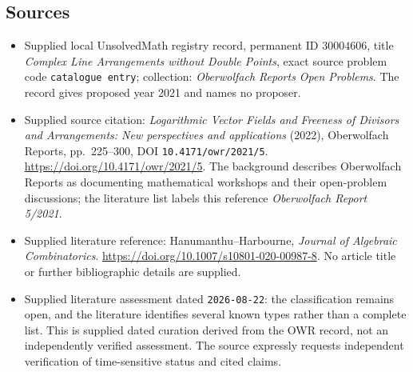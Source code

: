 \documentclass[11pt]{article}
\begin{document}
\subsection{Sources}
\begin{itemize}
\item Supplied local UnsolvedMath registry record, permanent ID \(30004606\), title \emph{Complex Line Arrangements without Double Points}, exact source problem code \texttt{catalogue entry}; collection: \emph{Oberwolfach Reports Open Problems}. The record gives proposed year 2021 and names no proposer.
\item Supplied source citation: \emph{Logarithmic Vector Fields and Freeness of Divisors and Arrangements: New perspectives and applications} (2022), Oberwolfach Reports, pp.\ 225--300, DOI \texttt{10.4171/owr/2021/5}. \url{https://doi.org/10.4171/owr/2021/5}. The background describes Oberwolfach Reports as documenting mathematical workshops and their open-problem discussions; the literature list labels this reference \emph{Oberwolfach Report 5/2021}.
\item Supplied literature reference: Hanumanthu--Harbourne, \emph{Journal of Algebraic Combinatorics}. \url{https://doi.org/10.1007/s10801-020-00987-8}. No article title or further bibliographic details are supplied.
\item Supplied literature assessment dated \texttt{2026-08-22}: the classification remains open, and the literature identifies several known types rather than a complete list. This is supplied dated curation derived from the OWR record, not an independently verified assessment. The source expressly requests independent verification of time-sensitive status and cited claims.
\end{itemize}
\end{document}
